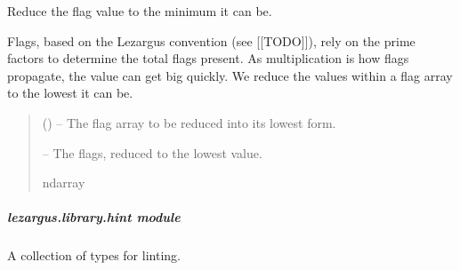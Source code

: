 \documentclass[letterpaper,11pt,english]{sphinxmanual}
\begin{document}
\begin{savenotes}\begin{fulllineitems}
\label{\detokenize{code/lezargus.library.flags:lezargus.library.flags.reduce_flags}}
\pysigstartsignatures
{}
\pysigstopsignatures
\sphinxAtStartPar
Reduce the flag value to the minimum it can be.

\sphinxAtStartPar
Flags, based on the Lezargus convention (see {[}{[}TODO{]}{]}),
rely on the prime factors to determine the total flags present. As
multiplication is how flags propagate, the value can get big quickly.
We reduce the values within a flag array to the lowest it can be.
\begin{quote}\begin{description}
\sphinxAtStartPar
{} () – The flag array to be reduced into its lowest form.

\sphinxAtStartPar
{} – The flags, reduced to the lowest value.

\sphinxAtStartPar
ndarray

\end{description}\end{quote}

\end{fulllineitems}\end{savenotes}


\sphinxstepscope


\subparagraph{lezargus.library.hint module}
\label{\detokenize{code/lezargus.library.hint:module-lezargus.library.hint}}\label{\detokenize{code/lezargus.library.hint:lezargus-library-hint-module}}\label{\detokenize{code/lezargus.library.hint::doc}}
\sphinxAtStartPar
A collection of types for linting.
\end{document}
